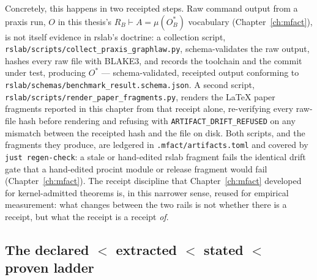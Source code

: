 Concretely, this happens in two receipted steps. Raw command output from
a praxis run, $O$ in this thesis's $R_B \vdash A = \mu(O^*_B)$ vocabulary
(Chapter~\ref{ch:mfact}), is not itself evidence in rslab's doctrine: a
collection script, \texttt{rslab/scripts/collect\_praxis\_graphlaw.py},
schema-validates the raw output, hashes every raw file with BLAKE3, and
records the toolchain and the commit under test, producing $O^*$ ---
schema-validated, receipted output conforming to
\texttt{rslab/schemas/benchmark\_result.schema.json}. A second script,
\texttt{rslab/scripts/render\_paper\_fragments.py}, renders the LaTeX
paper fragments reported in this chapter from that receipt alone,
re-verifying every raw-file hash before rendering and refusing with
\texttt{ARTIFACT\_DRIFT\_REFUSED} on any mismatch between the receipted
hash and the file on disk. Both scripts, and the fragments they produce,
are ledgered in \texttt{.mfact/artifacts.toml} and covered by
\texttt{just regen-check}: a stale or hand-edited rslab fragment fails
the identical drift gate that a hand-edited \textsf{procint} module or
release fragment would fail (Chapter~\ref{ch:mfact}). The receipt
discipline that Chapter~\ref{ch:mfact} developed for kernel-admitted
theorems is, in this narrower sense, reused for empirical measurement:
what changes between the two rails is not whether there is a receipt, but
what the receipt is a receipt \emph{of}.

\subsection{The declared \texorpdfstring{$<$}{<} extracted \texorpdfstring{$<$}{<} stated \texorpdfstring{$<$}{<} proven ladder}
\label{sec:emp-ladder}

